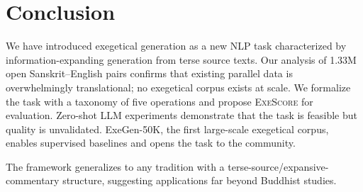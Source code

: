 \documentclass[11pt]{article}
\begin{document}
\section{Conclusion}
\label{sec:conclusion}

We have introduced exegetical generation as a new NLP task characterized by information-expanding generation from terse source texts. Our analysis of 1.33M open Sanskrit--English pairs confirms that existing parallel data is overwhelmingly translational; no exegetical corpus exists at scale. We formalize the task with a taxonomy of five operations and propose \textsc{ExeScore} for evaluation. Zero-shot LLM experiments demonstrate that the task is feasible but quality is unvalidated. ExeGen-50K, the first large-scale exegetical corpus, enables supervised baselines and opens the task to the community.

The framework generalizes to any tradition with a terse-source/expansive-commentary structure, suggesting applications far beyond Buddhist studies.




\end{document}
